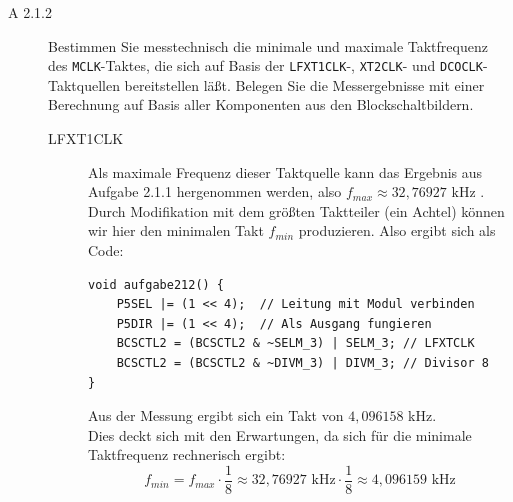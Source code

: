 \documentclass[11pt,a4paper,ngerman]{article}
\begin{document}
\begin{description}
	\item[A 2.1.2] Bestimmen Sie messtechnisch die minimale und maximale Taktfrequenz des \texttt{MCLK}-Taktes, die sich auf Basis der \texttt{LFXT1CLK}-, \texttt{XT2CLK}- und \texttt{DCOCLK}-Taktquellen bereitstellen läßt. Belegen Sie die Messergebnisse mit einer Berechnung auf Basis aller Komponenten aus den Blockschaltbildern.
		
		\begin{description}
			\item[LFXT1CLK] Als maximale Frequenz dieser Taktquelle kann das Ergebnis aus Aufgabe 2.1.1 hergenommen werden, also $f_{max} \approx 32,76927 \text{ kHz }$. Durch Modifikation mit dem größten Taktteiler (ein Achtel) können wir hier den minimalen Takt $f_{min}$ produzieren. Also ergibt sich als Code:
\begin{lstlisting}
void aufgabe212() {
    P5SEL |= (1 << 4);	// Leitung mit Modul verbinden
    P5DIR |= (1 << 4);	// Als Ausgang fungieren
    BCSCTL2 = (BCSCTL2 & ~SELM_3) | SELM_3; // LFXTCLK
    BCSCTL2 = (BCSCTL2 & ~DIVM_3) | DIVM_3; // Divisor 8
}
\end{lstlisting}
			Aus der Messung ergibt sich ein Takt von $4,096158$ kHz. \\
			Dies deckt sich mit den Erwartungen, da sich für die minimale Taktfrequenz rechnerisch ergibt:
			$$ f_{min} = f_{max} \cdot \frac{1}{8} \approx 32,76927 \text{ kHz} \cdot \frac{1}{8} \approx 4,096159 \text{ kHz}$$
			

\end{description}
\end{description}
\end{document}

